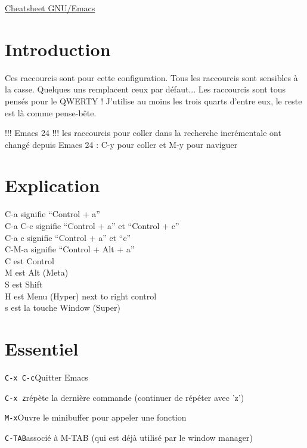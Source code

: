 \documentclass[10pt,landscape]{article}
\def\cm#1#2{{\tt#1}\dotfill#2\par}
\begin{document}
\raggedright
\footnotesize
\begin{multicols}{3}


\setlength{\premulticols}{1pt}
\setlength{\postmulticols}{1pt}
\setlength{\multicolsep}{1pt}
\setlength{\columnsep}{2pt}

\begin{center}
     \Large{\underline{Cheatsheet GNU/Emacs}} \\
\end{center}


\section{Introduction}
Ces raccourcis sont pour cette configuration.
Tous les raccourcis sont sensibles à la casse. Quelques uns remplacent ceux par défaut...
Les raccourcis sont tous pensés pour le QWERTY !
J'utilise au moins les trois quarts d'entre eux, le reste est là comme pense-bête.

!!! Emacs 24 !!! les raccourcis pour coller dans la recherche incrémentale ont changé depuis Emacs 24 : C-y pour coller et M-y pour naviguer

\section{Explication}
C-a signifie ``Control + a''\\
C-a C-c signifie ``Control + a'' et ``Control + c''\\
C-a c signifie ``Control + a'' et ``c''\\
C-M-a signifie ``Control + Alt + a''\\
C est Control\\
M est Alt (Meta)\\
S est Shift\\
H est Menu (Hyper) next to right control\\
s est la touche Window (Super)\\






\section{Essentiel}
\cm{C-x C-c}{Quitter Emacs}
\cm{C-x z}{répète la dernière commande (continuer de répéter avec 'z')}
\cm{M-x}{Ouvre le minibuffer pour appeler une fonction}
\cm{C-TAB}{associé à M-TAB (qui est déjà utilisé par le window manager)}






\end{multicols}
\end{document}
